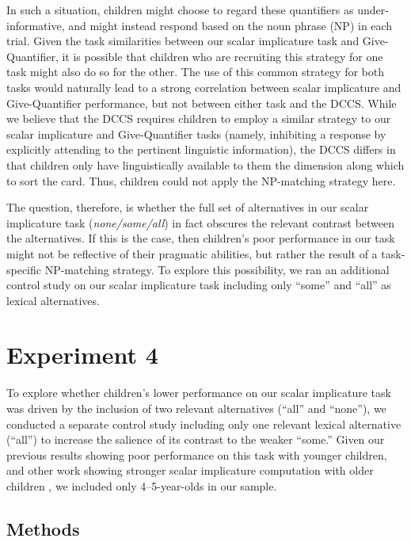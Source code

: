 \documentclass[man]{apa2}
\begin{document}
In such a situation, children might choose to regard these quantifiers as under-informative, and might instead respond based on the noun phrase (NP) in each trial. Given the task similarities between our scalar implicature task and Give-Quantifier, it is possible that children who are recruiting this strategy for one task might also do so for the other. The use of this common strategy for both tasks would naturally lead to a strong correlation between scalar implicature and Give-Quantifier performance, but not between either task and the DCCS. While we believe that the DCCS requires children to employ a similar strategy to our scalar implicature and Give-Quantifier tasks (namely, inhibiting a response by explicitly attending to the pertinent linguistic information), the DCCS differs in that children only have linguistically available to them the dimension along which to sort the card. Thus, children could not apply the NP-matching strategy here.

The question, therefore, is whether the full set of alternatives in our scalar implicature task (\emph{none/some/all}) in fact obscures the relevant contrast between the alternatives. If this is the case, then children's poor performance in our task might not be reflective of their pragmatic abilities, but rather the result of a task-specific NP-matching strategy. To explore this possibility, we ran an additional control study on our scalar implicature task including only ``some'' and ``all'' as lexical alternatives.

\section{Experiment 4}

To explore whether children's lower performance on our scalar implicature task was driven by the inclusion of two relevant alternatives (``all'' and ``none''), we conducted a separate control study including only one relevant lexical alternative (``all'') to increase the salience of its contrast to the weaker ``some.'' Given our previous results showing poor performance on this task with younger children, and other work showing stronger scalar implicature computation with older children \cite{skordos2016}, we included only 4--5-year-olds in our sample.

\subsection{Methods}
\end{document}
